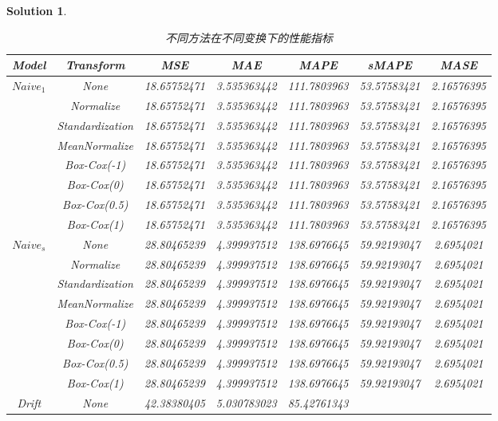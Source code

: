 \documentclass[a4paper,UTF8]{article}
\numberwithin{equation}{section}
\newtheorem*{mySol}{Solution}
\begin{document}
\begin{mySol}
		\begin{table}[]
			\centering
			\caption{不同方法在不同变换下的性能指标}
			\begin{tabular}{ccccccc}
				\toprule
				Model                      & Transform & MSE & MAE & MAPE & sMAPE & MASE \\
				\midrule
				\multirow{8}{*}{$Naive_1$} & None & 18.65752471 & 3.535363442 &  111.7803963 & 53.57583421 &  2.16576395 \\
				& Normalize  & 18.65752471 & 3.535363442 &  111.7803963 & 53.57583421 &  2.16576395 \\
				& Standardization  & 18.65752471 & 3.535363442 &  111.7803963 & 53.57583421 &  2.16576395 \\
				& MeanNormalize  & 18.65752471 & 3.535363442 &  111.7803963 & 53.57583421 &  2.16576395 \\
				& Box-Cox(-1)    & 18.65752471 & 3.535363442 &  111.7803963 & 53.57583421 &  2.16576395 \\
				& Box-Cox(0)    & 18.65752471 & 3.535363442 &  111.7803963 & 53.57583421 &  2.16576395 \\
				& Box-Cox(0.5)    & 18.65752471 & 3.535363442 &  111.7803963 & 53.57583421 &  2.16576395 \\
				& Box-Cox(1)    & 18.65752471 & 3.535363442 &  111.7803963 & 53.57583421 &  2.16576395 \\
				\midrule
				\multirow{8}{*}{$Naive_s$} & None & 28.80465239 & 4.399937512 & 138.6976645 & 59.92193047 & 2.6954021\\
				& Normalize   & 28.80465239 & 4.399937512 & 138.6976645 & 59.92193047 & 2.6954021\\
				& Standardization  & 28.80465239 & 4.399937512 & 138.6976645 & 59.92193047 & 2.6954021\\
				& MeanNormalize   & 28.80465239 & 4.399937512 & 138.6976645 & 59.92193047 & 2.6954021\\
				& Box-Cox(-1)     & 28.80465239 & 4.399937512 & 138.6976645 & 59.92193047 & 2.6954021\\
				& Box-Cox(0)     & 28.80465239 & 4.399937512 & 138.6976645 & 59.92193047 & 2.6954021\\
				& Box-Cox(0.5)     & 28.80465239 & 4.399937512 & 138.6976645 & 59.92193047 & 2.6954021\\
				& Box-Cox(1)     & 28.80465239 & 4.399937512 & 138.6976645 & 59.92193047  & 2.6954021\\
				\midrule
				\multirow{8}{*}{Drift} & None    & 42.38380405
				    &  5.030783023
				       &  85.42761343

\end{tabular}
\end{table}
\end{mySol}
\end{document}
